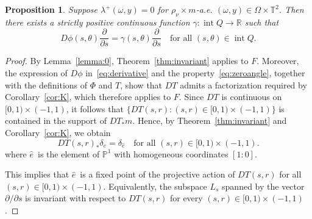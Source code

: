 \documentclass[a4paper,12pt,reqno]{amsart}
\numberwithin{equation}{section}
\newtheorem{proposition}[theorem]{Proposition}
\newcommand{\Tt}{{\mathbb{T}}}
\begin{document}
\begin{proposition}
\label{prop:6}
Suppose $\lambda^+(\omega,y)=0$ for $\rho_\nu \times m$-a.e. $(\omega,y) \in \Omega \times \Tt^2$. Then there exists a strictly positive continuous function $\gamma \colon \operatorname{int} Q \to \mathbb{R}$ such that
\[
D \phi(s,\theta) \frac{\partial}{\partial s} = \gamma(s,\theta) \frac{\partial}{\partial s} \quad \text{for all } (s,\theta) \in \operatorname{int} Q.
\]
\end{proposition}

\begin{proof}
By Lemma~\ref{lemma:0}, Theorem~\ref{thm:invariant} applies to $F$. Moreover, the expression of $D\phi$ in~\eqref{eq:derivative} and the property~\eqref{eq:zeroangle}, together with the definitions of $\Phi$ and $T$, show that $DT$ admits a factorization required by Corollary~\ref{cor:K}, which therefore applies to $F$. Since $DT$ is continuous on $[0,1) \times (-1,1)$, it follows that $\{DT(s,r) \colon (s,r) \in [0,1) \times (-1,1)\}$ is contained in the support of $DT_* m$. Hence, by Theorem~\ref{thm:invariant} and Corollary~\ref{cor:K}, we obtain
\[
DT(s,r)_* \delta_{\widehat{e}} = \delta_{\widehat{e}} \quad \text{for all } (s,r) \in [0,1) \times (-1,1).
\]
 where $\widehat{e} \,$ is the element of $\mathbb{P}^1$ with homogeneous coordinates $[1:0]$. 
 
This implies that $\widehat{e} \,$ is a fixed point of the projective action of $DT(s,r)$ for all $(s,r) \in [0,1) \times (-1,1)$. Equivalently, the subspace $L_s$ spanned by the vector $\partial/\partial s$ is invariant with respect to $DT(s,r)$ for every $(s,r) \in [0,1) \times (-1,1)$.


\end{proof}
\end{document}
